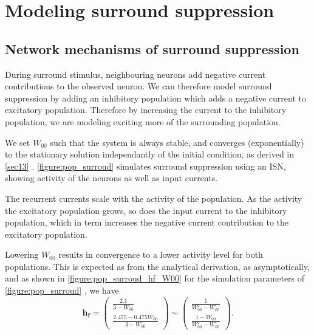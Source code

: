 \documentclass[10pt,conference,compsocconf,a4paper]{IEEEtran}
\renewcommand{\vec}[1]{\boldsymbol{#1}}
\newcommand*{\shortautoref}[1]{%
	\begingroup
	\def\equationautorefname{\textsc{Eq.}}%
	\def\tableautorefname{\textsc{Tab.}}%
	\def\figureautorefname{\textsc{Fig.}}%
	\autoref{#1}%
	\endgroup
}
\begin{document}
\section{Modeling surround suppression}
\label{sec2}

	\subsection{Network mechanisms of surround suppression}
	\label{sec21}

		During surround stimulus, neighbouring neurons add negative current contributions to the observed neuron. We can therefore model surround suppression by adding an inhibitory population which adds a negative current to excitatory population. Therefore by increasing the current to the inhibitory population, we are modeling exciting more of the surrounding population.

		We set $W_{00}$ such that the system is always stable, and converges (exponentially) to the stationary solution independantly of the initial condition, as derived in \shortautoref{sec13}. \shortautoref{figure:pop_surroud} simulates surround suppression using an ISN, showing activity of the neurons as well as input currents.

		The recurrent currents scale with the activity of the population. As the activity the excitatory population grows, so does the input current to the inhibitory population, which in term increases the negative current contribution to the excitatory population.

		Lowering $W_{00}$ results in convergence to a lower activity level for both populations. This is expected as from the analytical derivation, as asymptotically, and as shown in \shortautoref{figure:pop_surroud_hf_W00} for the simulation parameters of \shortautoref{figure:pop_surroud}, we have
	\
		\begin{equation*}
			\vec{h_f} =
			\begin{pmatrix}
				\frac{2.1}{3-W_{00}}\\
				\frac{2.475 - 0.475W_{00}}{3-W_{00}}
			\end{pmatrix}
			\sim \begin{pmatrix}
				\frac{1}{W_{00}^\star - W_{00}} \\
				\frac{1 - W_{00}}{W_{00}^\star - W_{00}}
			\end{pmatrix}.
		\end{equation*}
\end{document}
